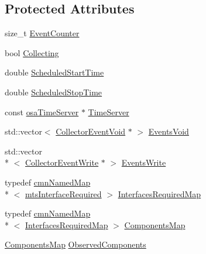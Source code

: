 \subsection*{Protected Attributes}
\begin{DoxyCompactItemize}
\item 
size\-\_\-t \hyperlink{classmts_collector_event_a1249f64f2e4e0f3686ee6785bb8b1740}{Event\-Counter}
\item 
bool \hyperlink{classmts_collector_event_ae9292be0812681c2a314e048a0a4f0a5}{Collecting}
\item 
double \hyperlink{classmts_collector_event_a16f82074f7e622b72a100c8c99c1354e}{Scheduled\-Start\-Time}
\item 
double \hyperlink{classmts_collector_event_ad7213ee6804878731b6d0d7effa3dd0a}{Scheduled\-Stop\-Time}
\item 
const \hyperlink{classosa_time_server}{osa\-Time\-Server} $\ast$ \hyperlink{classmts_collector_event_a0bf692d3a1e6c8eb40b4ae32053dba2e}{Time\-Server}
\end{DoxyCompactItemize}
{\bf }\par
\begin{DoxyCompactItemize}
\item 
std\-::vector$<$ \hyperlink{classmts_collector_event_1_1_collector_event_void}{Collector\-Event\-Void} $\ast$ $>$ \hyperlink{classmts_collector_event_a5c71a9d9e4ebcd24d5b72c096aa48615}{Events\-Void}
\item 
std\-::vector\\*
$<$ \hyperlink{classmts_collector_event_1_1_collector_event_write}{Collector\-Event\-Write} $\ast$ $>$ \hyperlink{classmts_collector_event_a6924ca78e61980e8079b5957e7648ad7}{Events\-Write}
\end{DoxyCompactItemize}

\begin{DoxyCompactItemize}
\item 
typedef \hyperlink{classcmn_named_map}{cmn\-Named\-Map}\\*
$<$ \hyperlink{classmts_interface_required}{mts\-Interface\-Required} $>$ \hyperlink{classmts_collector_event_ac8f5ef3f2d36cef5c1dc78cb35fc79bd}{Interfaces\-Required\-Map}
\item 
typedef \hyperlink{classcmn_named_map}{cmn\-Named\-Map}\\*
$<$ \hyperlink{classmts_collector_event_ac8f5ef3f2d36cef5c1dc78cb35fc79bd}{Interfaces\-Required\-Map} $>$ \hyperlink{classmts_collector_event_a06ae73259368d52dfbde74f94a3b1dfb}{Components\-Map}
\item 
\hyperlink{classmts_collector_event_a06ae73259368d52dfbde74f94a3b1dfb}{Components\-Map} \hyperlink{classmts_collector_event_a0f4a7cc03d7c29dc4b853fc248415578}{Observed\-Components}
\end{DoxyCompactItemize}
